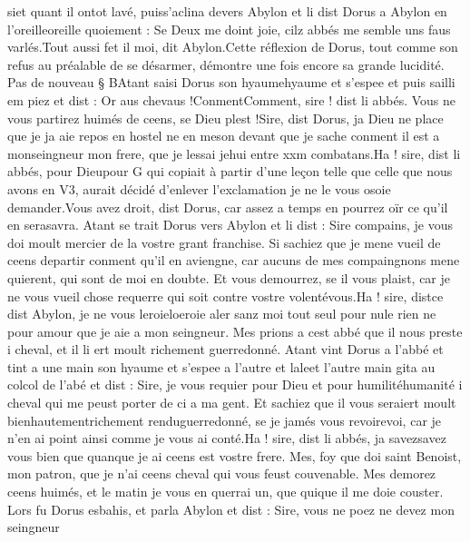 \documentclass{article}
\begin{document}
\begin{pages}
   siet quant il ontot 
   lavé, puiss'aclina devers Abylon et li dist Dorus 
   a Abylon 
   en l’oreilleoreille quoiement :
   Se Deux me doint joie, 
      cilz abbés me semble uns faus varlés.Tout aussi fet il moi, dit Abylon.Cette
   réflexion de Dorus, tout comme son refus au préalable de se désarmer, démontre une fois encore sa grande lucidité. \pend
\pstart Pas de nouveau § BAtant saisi Dorus 
   son hyaumehyaume et s'espee et puis sailli em piez et dist :
   Or aus chevaus !ConmentComment, sire ! dist 
      li abbés. Vous ne vous partirez huimés de ceens, se Dieu plest !Sire, dist Dorus, ja Dieu ne place que je ja aie repos 
   en hostel ne en meson devant que je sache conment il est a monseingneur mon frere, 
   que je lessai jehui entre xxm combatans.Ha ! sire, dist li abbés, 
      pour Dieupour
      G qui copiait à partir d’une leçon telle que celle que nous avons en V3, 
         aurait décidé d’enlever l’exclamation je ne 
      le vous osoie demander.Vous avez droit, dist Dorus, 
      car assez a temps en pourrez oïr ce qu’il en serasavra.
   Atant se trait Dorus vers Abylon et li dist :
   Sire compains, je vous doi moult mercier de la vostre grant franchise. 
      Si sachiez que je mene vueil de ceens departir conment qu’il 
      en aviengne, 
      car aucuns de mes compaingnons mene quierent, 
   qui sont de moi en doubte. Et vous demourrez, se il vous plaist, car je ne vous vueil chose requerre qui soit contre 
      vostre volentévous.Ha ! sire, distce dist 
      Abylon, je ne vous leroieloeroie 
      aler sanz moi tout 
      seul pour nule rien ne pour amour que je aie a mon seingneur. Mes prions a 
      cest abbé que il nous preste i cheval, et il li ert moult richement 
      guerredonné. \pend
\pstart Atant vint Dorus a l’abbé et 
   tint a une main son hyaume et s’espee 
   a l’autre et laleet l'autre main 
   gita 
   au colcol de l'abé et dist :
   Sire, je vous requier pour Dieu et pour 
      humilitéhumanité i cheval qui me peust porter de ci a ma gent. 
      Et sachiez que il vous 
      seraiert moult 
      bienhautementrichement
      renduguerredonné, se je jamés vous 
      revoirevoi, car je n'en ai point ainsi comme je vous ai conté.Ha ! sire, dist li abbés, ja 
      savezsavez vous bien que 
   quanque je ai ceens est vostre frere. Mes, foy que doi saint Benoist, mon patron, 
      que je n’ai ceens cheval qui vous feust couvenable. Mes demorez ceens huimés, et le matin je vous en querrai un, que 
      quique il me doie couster.
   Lors fu Dorus esbahis, et parla Abylon et dist :
   Sire, vous ne poez ne devez mon seingneur 

\end{pages}
\end{document}

